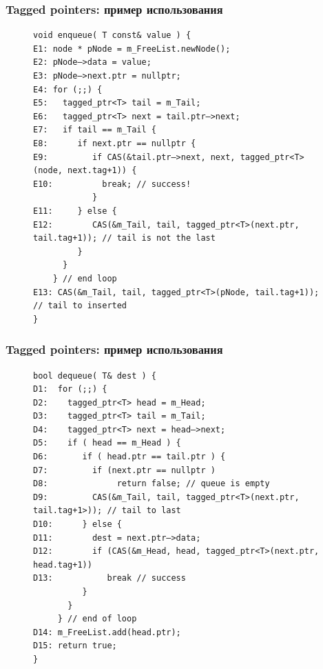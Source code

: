\documentclass[aspectratio=169, pdf, 8pt, unicode]{beamer}
\begin{document}
\begin{frame}[fragile]
\frametitle{Tagged pointers: пример использования}
\begin{figure}[H]
\centering
\begin{minipage}{0.8\textwidth}
\small
\begin{verbatim}
void enqueue( T const& value ) {
E1: node * pNode = m_FreeList.newNode();
E2: pNode–>data = value;
E3: pNode–>next.ptr = nullptr;
E4: for (;;) {
E5:   tagged_ptr<T> tail = m_Tail;
E6:   tagged_ptr<T> next = tail.ptr–>next;
E7:   if tail == m_Tail {
E8:      if next.ptr == nullptr {
E9:         if CAS(&tail.ptr–>next, next, tagged_ptr<T>(node, next.tag+1)) {
E10:          break; // success!
            }
E11:     } else {
E12:        CAS(&m_Tail, tail, tagged_ptr<T>(next.ptr, tail.tag+1)); // tail is not the last
         }
      }
    } // end loop
E13: CAS(&m_Tail, tail, tagged_ptr<T>(pNode, tail.tag+1)); // tail to inserted
}
\end{verbatim}
\end{minipage}%
\end{figure}
\end{frame}

\begin{frame}[fragile]
\frametitle{Tagged pointers: пример использования}
\begin{figure}[H]
\centering
\begin{minipage}{0.8\textwidth}
\small
\begin{verbatim}
bool dequeue( T& dest ) {
D1:  for (;;) {
D2:    tagged_ptr<T> head = m_Head;
D3:    tagged_ptr<T> tail = m_Tail;
D4:    tagged_ptr<T> next = head–>next;
D5:    if ( head == m_Head ) {
D6:       if ( head.ptr == tail.ptr ) {
D7:         if (next.ptr == nullptr )
D8:              return false; // queue is empty
D9:         CAS(&m_Tail, tail, tagged_ptr<T>(next.ptr, tail.tag+1>)); // tail to last
D10:      } else {
D11:        dest = next.ptr–>data;
D12:        if (CAS(&m_Head, head, tagged_ptr<T>(next.ptr, head.tag+1))
D13:           break // success
          }
       }
     } // end of loop
D14: m_FreeList.add(head.ptr);
D15: return true;
}
\end{verbatim}
\end{minipage}%
\end{figure}
\end{frame}
\end{document}
